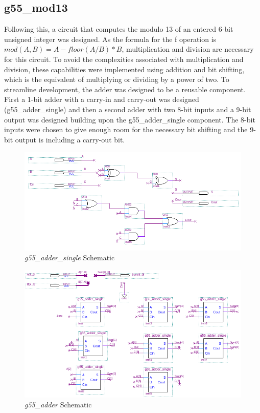 \documentclass[12pt]{article}
\begin{document}
\subsection{g55\_mod13}
Following this, a circuit that computes the modulo 13 of an entered 6-bit unsigned integer was designed. As the formula for the f operation is $mod(A, B) = A -floor(A/B)*B$, multiplication and division are necessary for this circuit. To avoid the complexities associated with multiplication and division, these capabilities were implemented using addition and bit shifting, which is the equivalent of multiplying or dividing by a power of two. To streamline development, the adder was designed to be a reusable component. First a 1-bit adder with a carry-in and carry-out was designed (g55\_adder\_single) and then a second adder with two 8-bit inputs and a 9-bit output was designed building upon the g55\_adder\_single component. The 8-bit inputs were chosen to give enough room for the necessary bit shifting and the 9-bit output is including a carry-out bit.\\
\begin{figure}[h!t]
	\includegraphics[scale=0.5]{graphics/adder_single_schematic.png}
	\caption{\textit{g55\_adder\_single} Schematic}
\end{figure}
\begin{figure}[h!t]
	\includegraphics[scale=0.6]{graphics/adder_schematic.png}
	\caption{\textit{g55\_adder} Schematic}
\end{figure}
\end{document}
